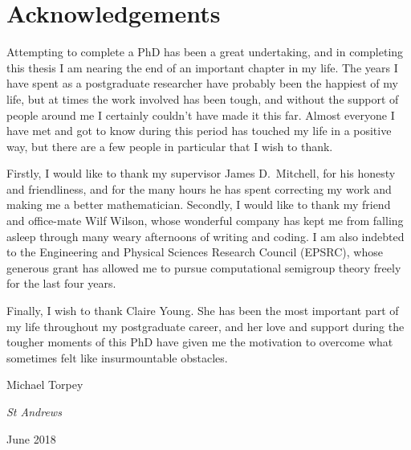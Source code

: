 \chapter*{Acknowledgements}

Attempting to complete a PhD has been a great undertaking, and in completing
this thesis I am nearing the end of an important chapter in my life.  The years
I have spent as a postgraduate researcher have probably been the happiest of my
life, but at times the work involved has been tough, and without the support of
people around me I certainly couldn't have made it this far.  Almost everyone I
have met and got to know during this period has touched my life in a positive
way, but there are a few people in particular that I wish to thank.

Firstly, I would like to thank my supervisor James D.~Mitchell, for his honesty
and friendliness, and for the many hours he has spent correcting my work and
making me a better mathematician.  Secondly, I would like to thank my friend and
office-mate Wilf Wilson, whose wonderful company has kept me from falling asleep
through many weary afternoons of writing and coding.  I am also indebted to the
Engineering and Physical Sciences Research Council (EPSRC), whose generous grant
has allowed me to pursue computational semigroup theory freely for the last four
years.

Finally, I wish to thank Claire Young.  She has been the most important part of
my life throughout my postgraduate career, and her love and support during the
tougher moments of this PhD have given me the motivation to overcome what
sometimes felt like insurmountable obstacles.

\begin {flushright}
  \singlespacing
  Michael Torpey

  \textit{St Andrews}

  June 2018
\end {flushright}

